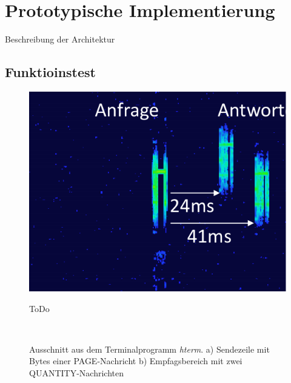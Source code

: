 \chapter{Prototypische Implementierung}\label{kap:prototyp}

Beschreibung der Architektur \\

\section{Funktioinstest}

\begin{figure}[bth]
        \myfloatalign
        {\includegraphics[width=0.6\linewidth]{gfx/Vers_01_Spac}} 
        \caption[Spektrumanalyzer]{ToDo}\label{fig:spac_2antworten}
\end{figure}

\begin{figure}[bth]
        \myfloatalign
         \\
        \caption[Terminal TX RX]{Ausschnitt aus dem Terminalprogramm \emph{hterm}. a) Sendezeile mit Bytes einer PAGE-Nachricht b) Empfagsbereich mit zwei QUANTITY-Nachrichten}\label{fig:terminal}
\end{figure}

